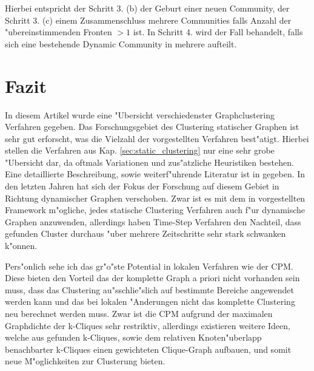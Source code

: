 \documentclass[journal]{vgtc}
\begin{document}
    Hierbei entspricht der Schritt 3. (b) der Geburt einer neuen Community, der Schritt 3. (c) einem Zusammenschluss mehrere Communities falls Anzahl der "ubereinstimmenden
    Fronten $>1$ ist. In Schritt 4. wird der Fall behandelt, falls sich eine bestehende Dynamic Community in mehrere aufteilt.

\section{Fazit}
  In diesem Artikel wurde eine "Ubersicht verschiedenster Graphclustering Verfahren gegeben. Das Forschungsgebiet des Clustering statischer Graphen ist sehr gut
  erforscht, was die Vielzahl der vorgestellten Verfahren best"atigt. Hierbei stellen die Verfahren aus Kap. \ref{sec:static_clustering} nur eine sehr grobe "Ubersicht
  dar, da oftmals Variationen und zus"atzliche Heuristiken bestehen. Eine detaillierte Beschreibung, sowie weiterf"uhrende Literatur ist in \cite{Schaeffer} gegeben.
  In den letzten Jahren hat sich der Fokus der Forschung auf diesem Gebiet in Richtung dynamischer Graphen verschoben. Zwar ist es mit dem in \cite{timestep} vorgestellten
  Framework m"ogliche, jedes statische Clustering Verfahren auch f"ur dynamische Graphen anzuwenden, allerdings haben Time-Step Verfahren den Nachteil, dass gefunden Cluster
  durchaus "uber mehrere Zeitschritte sehr stark schwanken k"onnen.
  
  Pers"onlich sehe ich das gr"o"ste Potential in lokalen Verfahren wie der CPM. Diese bieten den Vorteil das der komplette Graph a priori nicht vorhanden sein muss, 
  dass das Clustering au"sschlie"slich auf bestimmte Bereiche angewendet werden kann und das bei lokalen "Anderungen nicht das komplette Clustering neu berechnet werden muss.
  Zwar ist die CPM aufgrund der maximalen Graphdichte der k-Cliques sehr restriktiv, allerdings existieren weitere Ideen, welche aus gefunden k-Cliques, sowie dem
  relativen Knoten"uberlapp benachbarter k-Cliques einen gewichteten Clique-Graph\cite{clique_graph} aufbauen, und somit neue M"oglichkeiten zur Clusterung bieten.
    


\end{document}
